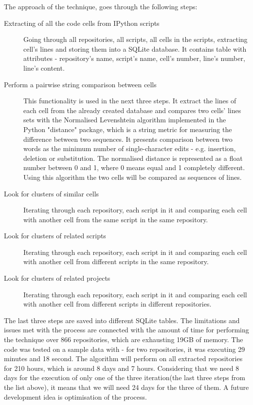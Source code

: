 The approach of the technique, goes through the following steps: 

\begin{description}
\item [Extracting of all the code cells from IPython scripts] 

Going through all repositories, all scripts, all cells in the scripts, extracting cell's lines and storing them into a SQLite database\cite{sqlite3}. It contains table with attributes - repository's name, script's name, cell's number, line's number, line's content.

\item[Perform a pairwise string comparison between cells] 

This functionality is used in the next three steps. It extract the lines of each cell from the already created database and compares two cells' lines sets with the Normalised Levenshtein algorithm implemented in the Python "distance" package\cite{distance}, which is a string metric for measuring the difference between two sequences. It presents comparison between two words as the minimum number of single-character edits - e.g. insertion, deletion or substitution\cite{levenstein}. The normalised distance is represented as a float number between 0 and 1, where 0 means equal and 1 completely different. Using this algorithm the two cells will be compared as sequences of lines.

\item [Look for clusters of similar cells]

Iterating through each repository, each script in it and comparing each cell with another cell from the same script in the same repository. 

\item [Look for clusters of related scripts]

Iterating through each repository, each script in it and comparing each cell with another cell from different scripts in the same repository.

\item [Look for clusters of related projects] 

Iterating through each repository, each script in it and comparing each cell with another cell from different scripts in different repositories. 

\end{description}

The last three steps are saved into different SQLite\cite{sqlite3} tables. The limitations and issues met with the process are connected with the amount of time for performing the technique over 866 repositories, which are exhausting 19GB of memory. The code was tested on a sample data with - for two repositories, it was executing 29 minutes and 18 second. The algorithm will perform on all extracted repositories for 210 hours, which is around 8 days and 7 hours. Considering that we need 8 days for the execution of only one of the three iteration(the last three steps from the list above), it means that we will need 24 days for the three of them. A future development idea is optimisation of the process. 


